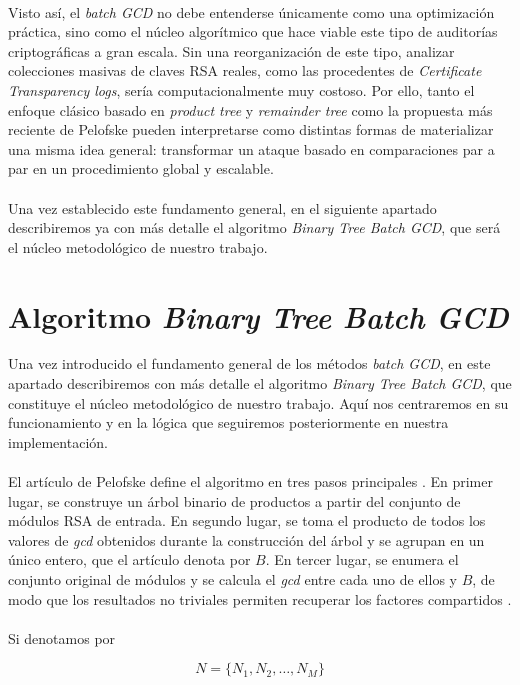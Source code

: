\\
Visto así, el \textit{batch GCD} no debe entenderse únicamente como una optimización práctica, sino como el núcleo algorítmico que hace viable este tipo de auditorías criptográficas a gran escala. Sin una reorganización de este tipo, analizar colecciones masivas de claves RSA reales, como las procedentes de \textit{Certificate Transparency logs}, sería computacionalmente muy costoso. Por ello, tanto el enfoque clásico basado en \textit{product tree} y \textit{remainder tree} como la propuesta más reciente de Pelofske pueden interpretarse como distintas formas de materializar una misma idea general: transformar un ataque basado en comparaciones par a par en un procedimiento global y escalable.
\\
\\
Una vez establecido este fundamento general, en el siguiente apartado describiremos ya con más detalle el algoritmo \textit{Binary Tree Batch GCD}, que será el núcleo metodológico de nuestro trabajo.

\section{Algoritmo \textit{Binary Tree Batch GCD}}

Una vez introducido el fundamento general de los métodos \textit{batch GCD}, en este apartado describiremos con más detalle el algoritmo \textit{Binary Tree Batch GCD}, que constituye el núcleo metodológico de nuestro trabajo. Aquí nos centraremos en su funcionamiento y en la lógica que seguiremos posteriormente en nuestra implementación.
\\
\\
El artículo de Pelofske define el algoritmo en tres pasos principales \cite{pelofske2024efficient}. En primer lugar, se construye un árbol binario de productos a partir del conjunto de módulos RSA de entrada. En segundo lugar, se toma el producto de todos los valores de \textit{gcd} obtenidos durante la construcción del árbol y se agrupan en un único entero, que el artículo denota por \(B\). En tercer lugar, se enumera el conjunto original de módulos y se calcula el \textit{gcd} entre cada uno de ellos y \(B\), de modo que los resultados no triviales permiten recuperar los factores compartidos \cite{pelofske2024efficient}.
\\
\\
Si denotamos por

\[
N = \{N_1, N_2, \dots, N_M\}
\]

